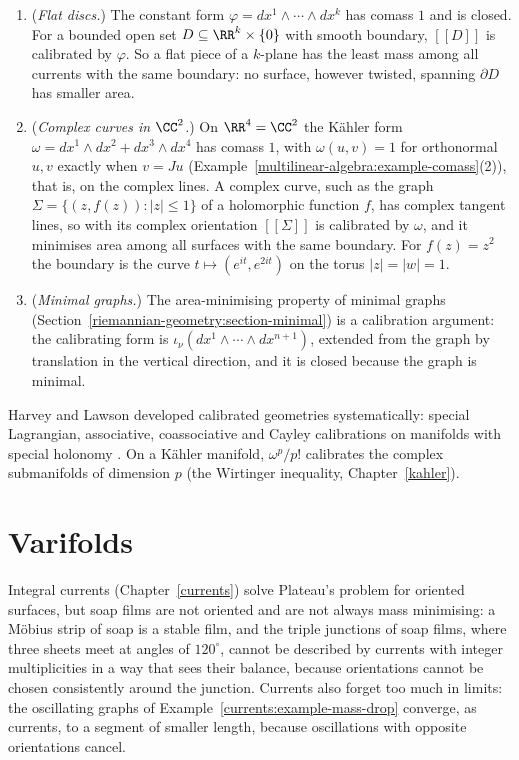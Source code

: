 \begin{example}\label{currents:example-calibrations}
\begin{enumerate}
\item (\emph{Flat discs.}) The constant form $\varphi = dx^1 \wedge \cdots \wedge dx^k$ has comass $1$ and is closed. For a bounded open set $D \subseteq \RR^k \times \{0\}$ with smooth boundary, $[\![D]\!]$ is
calibrated by $\varphi$. So a flat piece of a $k$-plane has the least mass among all currents with the same boundary: no surface, however twisted, spanning $\partial D$ has smaller area.
\item (\emph{Complex curves in $\CC^2$.}) On $\RR^4 = \CC^2$ the K\"ahler form $\omega = dx^1 \wedge dx^2 + dx^3 \wedge dx^4$ has comass $1$, with $\omega(u, v) = 1$ for orthonormal $u, v$ exactly when $v = Ju$
(Example~\ref{multilinear-algebra:example-comass}(2)), that is, on the complex lines. A complex curve, such as the graph $\Sigma = \{(z, f(z)) : |z| \leq 1\}$ of a holomorphic function $f$, has complex tangent
lines, so with its complex orientation $[\![\Sigma]\!]$ is calibrated by $\omega$, and it minimises area among all surfaces with the same boundary. For $f(z) = z^2$ the boundary is the curve
$t \mapsto (e^{it}, e^{2it})$ on the torus $|z| = |w| = 1$.
\item (\emph{Minimal graphs.}) The area-minimising property of minimal graphs (Section~\ref{riemannian-geometry:section-minimal}) is a calibration argument: the calibrating form is $\iota_\nu(dx^1 \wedge \cdots \wedge dx^{n+1})$,
extended from the graph by translation in the vertical direction, and it is closed because the graph is minimal.
\end{enumerate}
\end{example}

Harvey and Lawson developed calibrated geometries systematically: special Lagrangian, associative, coassociative and Cayley calibrations on manifolds with special holonomy \cite{joyce-special-holonomy}.
On a K\"ahler manifold, $\omega^p/p!$ calibrates the complex submanifolds of dimension $p$ (the Wirtinger inequality, Chapter~\ref{kahler}).

\section{Varifolds}\label{currents:section-varifolds}
Integral currents (Chapter~\ref{currents}) solve Plateau's problem for oriented surfaces, but soap films are not oriented and are not always mass minimising: a M\"obius strip of soap is a stable
film, and the triple junctions of soap films, where three sheets meet at angles of $120^\circ$, cannot be described by currents with integer multiplicities in a way that sees their balance, because
orientations cannot be chosen consistently around the junction. Currents also forget too much in limits: the oscillating graphs of Example~\ref{currents:example-mass-drop} converge, as currents, to a
segment of smaller length, because oscillations with opposite orientations cancel.

